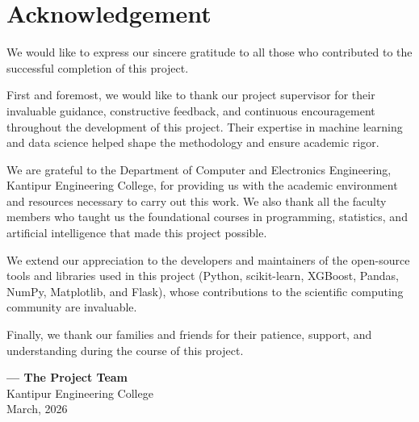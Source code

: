 \documentclass[12pt, a4paper]{report}
\begin{document}
	\chapter*{Acknowledgement}
	
	We would like to express our sincere gratitude to all those who contributed to the successful completion of this project.
	
	First and foremost, we would like to thank our project supervisor for their invaluable guidance, constructive feedback, and continuous encouragement throughout the development of this project. Their expertise in machine learning and data science helped shape the methodology and ensure academic rigor.
	
	We are grateful to the Department of Computer and Electronics Engineering, Kantipur Engineering College, for providing us with the academic environment and resources necessary to carry out this work. We also thank all the faculty members who taught us the foundational courses in programming, statistics, and artificial intelligence that made this project possible.
	
	We extend our appreciation to the developers and maintainers of the open-source tools and libraries used in this project (Python, scikit-learn, XGBoost, Pandas, NumPy, Matplotlib, and Flask), whose contributions to the scientific computing community are invaluable.
	
	Finally, we thank our families and friends for their patience, support, and understanding during the course of this project.
	
	\vspace{1.5cm}
	\begin{flushright}
		\textbf{--- The Project Team}\\
		Kantipur Engineering College\\
		March, 2026
	\end{flushright}
	
	\tableofcontents
	\renewcommand{\listfigurename}{List of Figures}
	\listoffigures
	\renewcommand{\listtablename}{List of Tables}
	\listoftables
	
\end{document}
